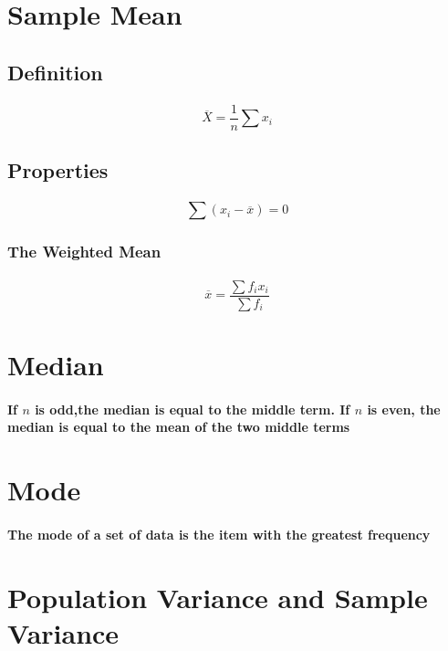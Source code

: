 \documentclass[titlepage]{article}
\begin{document}
    \section{Sample Mean}
        \subsection*{Definition}
            \paragraph{
                $$\overline{X}=\frac{1}{n} \sum x_i$$
            }
        \subsection*{Properties}
            \paragraph{
                $$\sum(x_i-\overline{x})=0$$
            }
            \subsubsection*{The Weighted Mean}
                \paragraph{
                    $$\overline{x}=\frac{\sum f_i x_i}{\sum f_i}$$
                }
    \section{Median}
        \paragraph{
            If $n$ is odd,the median is equal to the middle term. If $n$ is even, the median is equal to the mean of the two middle terms
        }
    \section{Mode}
        \paragraph{The mode of a set of data is the item with the greatest frequency}
    \section{Population Variance and Sample Variance}
\end{document}
